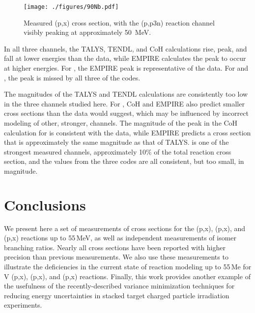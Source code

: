 \begin{figure}
 \centering
 \texttt{[image: ./figures/90Nb.pdf]}
 \caption{Measured (p,x) cross section, with the (p,p3n) reaction channel visibly peaking at approximately \mbox{50 MeV}.}
 \label{fig:temp_90Nb}
\end{figure}




In all three channels, the TALYS, TENDL, and CoH calculations rise, peak, and fall at lower energies than the data, while EMPIRE calculates the peak to occur at higher energies.
For , the EMPIRE peak is representative of the data.
For  and , the peak is missed by all three  of the codes.


The magnitudes of the TALYS and TENDL calculations are consistently too low in the three channels studied here. 
For , CoH and EMPIRE also predict smaller cross sections than the data would suggest, which may be influenced by incorrect modeling of other, stronger, channels.
The magnitude of the peak in the CoH calculation for   is consistent  with the data, while EMPIRE predicts a cross section that is approximately the same magnitude as that of TALYS.
 is one of the strongest measured channels, approximately 10\% of the total reaction cross section, and the values from the three codes are all consistent, but  too small, in magnitude.





 
 \section{\label{sec:conclusions_fe}Conclusions}
 

We present here a set of measurements of  cross sections for the (p,x), (p,x), and  (p,x) reactions up to 55\,MeV, as well as  independent measurements of  isomer branching ratios.
Nearly all cross sections have been reported with higher precision than previous measurements.
We also use these measurements to illustrate the deficiencies in the current state of  reaction modeling up to 55\,Me for V (p,x), (p,x), and  (p,x) reactions.
Finally, this work provides another example of the usefulness of the recently-described variance minimization techniques for reducing energy uncertainties in stacked target charged particle irradiation experiments.


